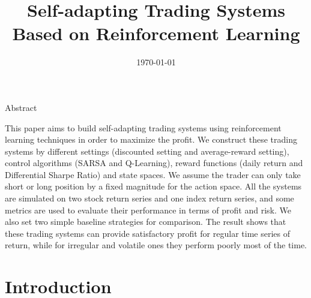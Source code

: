 \documentclass{article}
\title{Self-adapting Trading Systems Based on Reinforcement Learning} %
\date{\today}
\begin{document}
\maketitle %

\begin{center}
  {\Large Abstract}
\end{center}

\noindent This paper aims to build self-adapting trading systems using reinforcement learning techniques in order to maximize the profit. We construct these trading systems by different settings (discounted setting and average-reward setting), control algorithms (SARSA and Q-Learning), reward functions (daily return and Differential Sharpe Ratio) and state spaces. We assume the trader can only take short or long position by a fixed magnitude for the action space. All the systems are simulated on two stock return series and one index return series, and some metrics are used to evaluate their performance in terms of profit and risk. We also set two simple baseline strategies for comparison. The result shows that these trading systems can provide satisfactory profit for regular time series of return, while for irregular and volatile ones they perform poorly most of the time.


\section{Introduction} %
\end{document}
